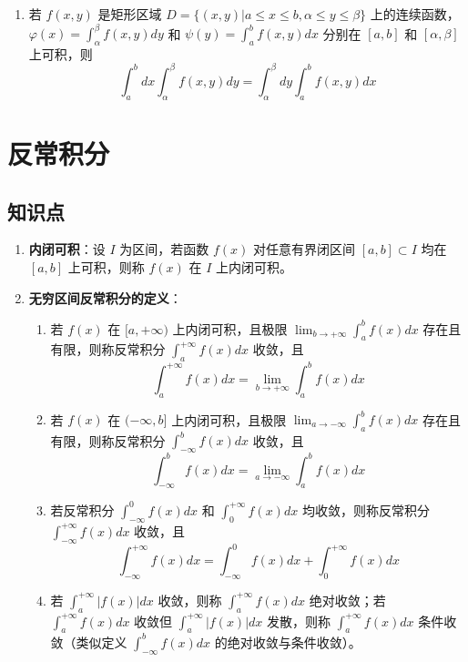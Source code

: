 \documentclass[UTF8]{ctexart}
\theoremstyle{remark}
\begin{document}
\begin{enumerate}
	\item 若 \(f(x, y)\) 是矩形区域 \(D = \{(x, y) | a \leq x \leq b, \alpha \leq y \leq \beta\}\) 上的连续函数，\(\varphi(x) = \int_{\alpha}^{\beta} f(x, y) dy\) 和 \(\psi(y) = \int_{a}^{b} f(x, y) dx\) 分别在 \([a, b]\) 和 \([\alpha, \beta]\) 上可积，则
	\[
	\int_{a}^{b} dx \int_{\alpha}^{\beta} f(x, y) dy = \int_{\alpha}^{\beta} dy \int_{a}^{b} f(x, y) dx
	\]
\end{enumerate}

\section{反常积分}
\subsection*{知识点}
\begin{enumerate}
	\item \textbf{内闭可积}：设 \(I\) 为区间，若函数 \(f(x)\) 对任意有界闭区间 \([a, b] \subset I\) 均在 \([a, b]\) 上可积，则称 \(f(x)\) 在 \(I\) 上内闭可积。
	
	\item \textbf{无穷区间反常积分的定义}：
	\begin{enumerate}
		\item 若 \(f(x)\) 在 \([a, +\infty)\) 上内闭可积，且极限 \(\lim_{b \to +\infty} \int_{a}^{b} f(x) dx\) 存在且有限，则称反常积分 \(\int_{a}^{+\infty} f(x) dx\) 收敛，且
		\[
		\int_{a}^{+\infty} f(x) dx = \lim_{b \to +\infty} \int_{a}^{b} f(x) dx
		\]
		\item 若 \(f(x)\) 在 \((-\infty, b]\) 上内闭可积，且极限 \(\lim_{a \to -\infty} \int_{a}^{b} f(x) dx\) 存在且有限，则称反常积分 \(\int_{-\infty}^{b} f(x) dx\) 收敛，且
		\[
		\int_{-\infty}^{b} f(x) dx = \lim_{a \to -\infty} \int_{a}^{b} f(x) dx
		\]
		\item 若反常积分 \(\int_{-\infty}^{0} f(x) dx\) 和 \(\int_{0}^{+\infty} f(x) dx\) 均收敛，则称反常积分 \(\int_{-\infty}^{+\infty} f(x) dx\) 收敛，且
		\[
		\int_{-\infty}^{+\infty} f(x) dx = \int_{-\infty}^{0} f(x) dx + \int_{0}^{+\infty} f(x) dx
		\]
		\item 若 \(\int_{a}^{+\infty} |f(x)| dx\) 收敛，则称 \(\int_{a}^{+\infty} f(x) dx\) 绝对收敛；若 \(\int_{a}^{+\infty} f(x) dx\) 收敛但 \(\int_{a}^{+\infty} |f(x)| dx\) 发散，则称 \(\int_{a}^{+\infty} f(x) dx\) 条件收敛（类似定义 \(\int_{-\infty}^{b} f(x) dx\) 的绝对收敛与条件收敛）。
	\end{enumerate}
	

\end{enumerate}
\end{document}
